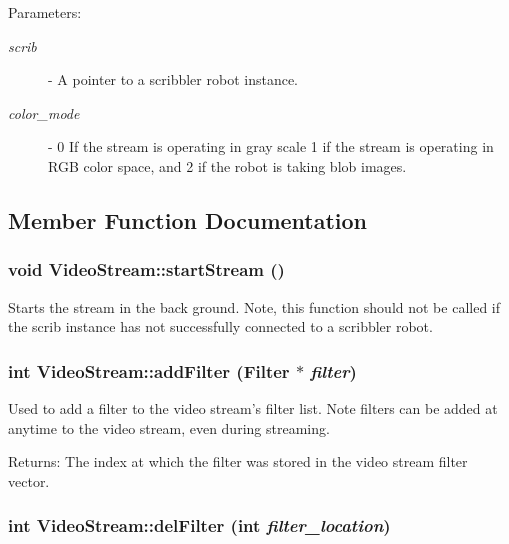 \begin{Desc}
\item[Parameters:]
\begin{description}
\item[{\em scrib}]- A pointer to a scribbler robot instance. \item[{\em color\_\-mode}]- 0 If the stream is operating in gray scale 1 if the stream is operating in RGB color space, and 2 if the robot is taking blob images. \end{description}
\end{Desc}


\subsection{Member Function Documentation}
\subsubsection{\setlength{\rightskip}{0pt plus 5cm}void VideoStream::startStream ()}\label{classVideoStream_706b92d2e36bdca2a4cd99f2f932fffa}


Starts the stream in the back ground. Note, this function should not be called if the scrib instance has not successfully connected to a scribbler robot. 
\subsubsection{\setlength{\rightskip}{0pt plus 5cm}int VideoStream::addFilter ({\bf Filter} $\ast$ {\em filter})}\label{classVideoStream_cc358aaa5ee9a97eb89cf427498749c7}


Used to add a filter to the video stream's filter list. Note filters can be added at anytime to the video stream, even during streaming.

\begin{Desc}
\item[Returns:]The index at which the filter was stored in the video stream filter vector. \end{Desc}
\subsubsection{\setlength{\rightskip}{0pt plus 5cm}int VideoStream::delFilter (int {\em filter\_\-location})}\label{classVideoStream_8f17354ee847f5348a51c40ea41301c1}


